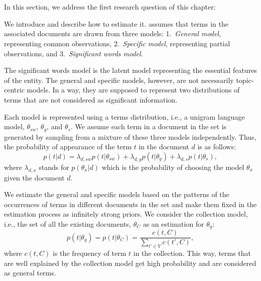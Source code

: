 \section{\SWLMs}
\label{sec:swlm}
In this section, we address the first research question of this chapter: 

We introduce \SWLMs and describe how to estimate it. \acswlm assumes that terms in the associated documents are drawn from three models: 1.~\emph{General model}, representing common observations, 2.~\emph{Specific model}, representing partial observations, and 3.~\emph{Significant words model}. 

The significant words model is the latent model representing the essential features of the entity. The general and specific models, however, are not necessarily topic-centric models. In a way, they are supposed to represent two distributions of terms that are not considered as significant information. 

Each model is represented using a terms distribution, i.e., a unigram language model, $\theta_{sw}$, $\theta_g$, and $\theta_s$. 
We assume each term in a document in the set is generated by sampling from a mixture of these three models independently. Thus, the probability of appearance of the term $t$ in the document $d$ is as follows:
\begin{equation}
p(t|d) =  \lambda_{d,sw} p(t|\theta_{sw}) + \lambda_{d,g} p(t|\theta_g) + \lambda_{d,s} p(t|\theta_s),
\end{equation}
where $\lambda_{d,x}$ stands for $p(\theta_x|d)$ which is the probability of choosing the model $\theta_x$ given the document $d$. 

We estimate the general and specific models based on the patterns of the occurrences of terms in different documents in the set and make them fixed in the estimation process as infinitely strong priors. 
We consider the collection model, i.e., the set of all the existing documents, $\theta_C$ as an estimation for $\theta_g$:
\begin{equation}
p(t|\theta_g) = 
p(t|\theta_C) = \frac{c(t,C)}{\sum_{t' \in V} c(t',C)},
\end{equation} 
where $c(t,C)$ is the frequency of term $t$ in the collection. This way, terms that are well explained by the collection model get high probability and are considered as general terms.

